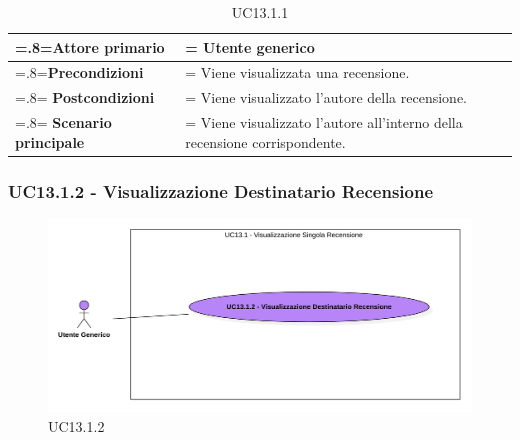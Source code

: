             \begin{table}[H]
                \centering
                \renewcommand{\arraystretch}{1.8}
                \renewcommand\tabularxcolumn[1]{m{#1}}
                \begin{tabularx}{0.9\textwidth} {
                    >{\hsize=.8\hsize\linewidth=\hsize}X
                    >{\hsize=1.2\hsize\linewidth=\hsize}X}
                    \hline
                    \textbf{Attore primario} & Utente generico \\
                    \hline
                    \textbf{Precondizioni} & Viene visualizzata una recensione. \\
                    \hline
                    \textbf{Postcondizioni} & Viene visualizzato l'autore della recensione. \\
                    \hline
                    \textbf{Scenario principale} & Viene visualizzato l'autore all'interno della recensione corrispondente. \\
                    \hline
                \end{tabularx}
                \caption{UC13.1.1}
            \end{table}

        \subsubsection{UC13.1.2 - Visualizzazione Destinatario Recensione}
        \label{UC13.1.2}

            \begin{figure}[H]
                \centering
                \includegraphics[scale=0.6]{src/img/UC13.1.2.png}
                \caption{UC13.1.2}
            \end{figure}

